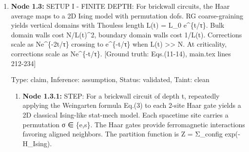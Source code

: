 \documentclass{article}
\begin{document}
\begin{enumerate}
\begin{enumerate}
  Type: claim, Inference: assumption, Status: validated, Taint: clean

\item \textbf{Node 1.2.3:} STEP: Using g\_\{π,σ\} = log\_d G\_\{π,σ\} - log\_d G̃\_\{π,σ\} and k=rN, simplify to get Eq.(9): E\_U Tr(ρ\_B\textasciicircum{}2) = d\textasciicircum{}\{-(g\_\{s,e\}+1)N\} + d\textasciicircum{}\{-(g\_\{s,s\}+r)N\} and E\_U Tr(ρ\_\{RB\}\textasciicircum{}2) = d\textasciicircum{}\{-(g\_\{s,e\}+1+r)N\} + d\textasciicircum{}\{-g\_\{s,s\}N\}. Taking -log\_d of dominant terms: I\_c/N = min(g\_\{s,e\}+1, g\_\{s,s\}+r) - min(g\_\{s,e\}+1+r, g\_\{s,s\}). [Eq.(10), verified at line 196]

  Type: claim, Inference: assumption, Status: validated, Taint: clean

\item \textbf{Node 1.2.4:} QED: The error-correction transition occurs when the two configurations become degenerate. For B-purity: g\_\{s,e\}+1 = g\_\{s,s\}+r, giving H\_2 = g\_\{s,s\}-g\_\{s,e\} = 1-r (Hashing bound). For unital noise, g\_\{s,e\}=0, so H\_2 = g\_\{s,s\} = 2-log\_d(1+(d\textasciicircum{}2-1)(1-γ)\textasciicircum{}2) for depolarizing. The transition at H\_2=1-r separates error-correcting phase (I\_c=k) from information-lost phase (I\_c<k).

  Type: claim, Inference: assumption, Status: validated, Taint: clean

\end{enumerate}
\item \textbf{Node 1.3:} SETUP I - FINITE DEPTH: For brickwall circuits, the Haar average maps to a 2D Ising model with permutation dofs. RG coarse-graining yields vertical domains with Thouless length L(t) = L\_0 e\textasciicircum{}\{t/τ\}. Bulk domain walls cost N/L(t)\textasciicircum{}2, boundary domain walls cost 1/L(t). Corrections scale as Ne\textasciicircum{}\{-2t/τ\} crossing to e\textasciicircum{}\{-t/τ\} when L(t) >> N. At criticality, corrections scale as Ne\textasciicircum{}\{-t/τ\}. [Ground truth: Eqs.(11-14), main.tex lines 212-234]

  Type: claim, Inference: assumption, Status: validated, Taint: clean

\begin{enumerate}
\item \textbf{Node 1.3.1:} STEP: For a brickwall circuit of depth t, repeatedly applying the Weingarten formula Eq.(3) to each 2-site Haar gate yields a 2D classical Ising-like stat-mech model. Each spacetime site carries a permutation σ ∈ \{e,s\}. The Haar gates provide ferromagnetic interactions favoring aligned neighbors. The partition function is Z = Σ\_config exp(-H\_Ising).


\end{enumerate}
\end{enumerate}
\end{document}
